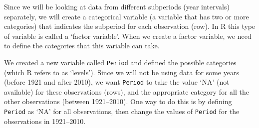 \documentclass[
]{article}
\newenvironment{Shaded}{\begin{snugshade}}{\end{snugshade}}
\newcommand{\AttributeTok}[1]{\textcolor[rgb]{0.13,0.29,0.53}{#1}}
\newcommand{\ConstantTok}[1]{\textcolor[rgb]{0.56,0.35,0.01}{#1}}
\newcommand{\DecValTok}[1]{\textcolor[rgb]{0.00,0.00,0.81}{#1}}
\newcommand{\FunctionTok}[1]{\textcolor[rgb]{0.13,0.29,0.53}{\textbf{#1}}}
\newcommand{\NormalTok}[1]{#1}
\newcommand{\OtherTok}[1]{\textcolor[rgb]{0.56,0.35,0.01}{#1}}
\newcommand{\SpecialCharTok}[1]{\textcolor[rgb]{0.81,0.36,0.00}{\textbf{#1}}}
\newcommand{\StringTok}[1]{\textcolor[rgb]{0.31,0.60,0.02}{#1}}
\begin{document}
Since we will be looking at data from different subperiods (year
intervals) separately, we will create a categorical variable (a variable
that has two or more categories) that indicates the subperiod for each
observation (row). In R this type of variable is called a `factor
variable'. When we create a factor variable, we need to define the
categories that this variable can take.

\begin{Shaded}
\end{Shaded}

We created a new variable called \texttt{Period} and defined the
possible categories (which R refers to as `levels'). Since we will not
be using data for some years (before 1921 and after 2010), we want
\texttt{Period} to take the value `NA' (not available) for these
observations (rows), and the appropriate category for all the other
observations (between 1921--2010). One way to do this is by defining
\texttt{Period} as `NA' for all observations, then change the values of
\texttt{Period} for the observations in 1921--2010.

\begin{Shaded}
\end{Shaded}
\end{document}
